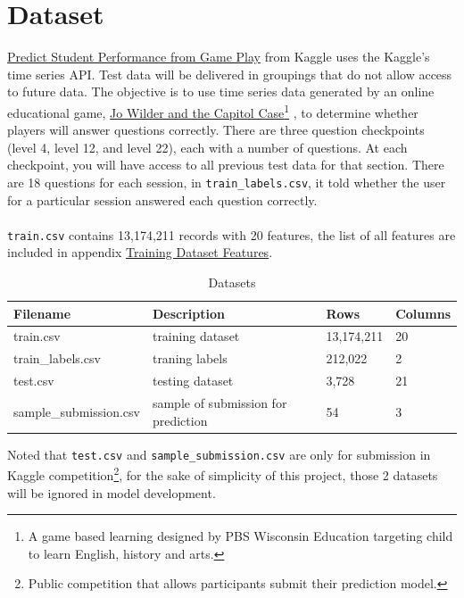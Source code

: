 \documentclass[11pt,a4paper]{article}
\begin{document}
    \section{Dataset}
    \href{https://www.kaggle.com/competitions/predict-student-performance-from-game-play/overview}{Predict Student Performance from Game Play} from Kaggle uses the Kaggle's time series API. Test data will be delivered in groupings that do not allow access to future data. The objective is to use time series data generated by an online educational game, \href{https://pbswisconsineducation.org/jowilder/about/}{Jo Wilder and the Capitol Case}\footnote{A game based learning designed by PBS Wisconsin Education targeting child to learn English, history and arts.} \cite{jo_wilder}, to determine whether players will answer questions correctly. There are three question checkpoints (level 4, level 12, and level 22), each with a number of questions. At each checkpoint, you will have access to all previous test data for that section. \cite{game_date} There are 18 questions for each session, in \texttt{train\_labels.csv}, it told whether the user for a particular session answered each question correctly. \\
    \\
    \texttt{train.csv} contains 13,174,211 records with 20 features, the list of all features are included in appendix \hyperref[appendix:training]{Training Dataset Features}. 
    \\
    \begin{table}[H]
        \centering
        \begin{tabular}{l | l | l l}
        Filename               & Description                                                       & Rows       & Columns \\ \hline
        train.csv              & training dataset                                                  & 13,174,211 & 20      \\
        train\_labels.csv      & traning labels                                                    & 212,022    & 2       \\
        test.csv               & testing dataset                                                   & 3,728      & 21      \\
        sample\_submission.csv & sample of submission for prediction & 54 & 3       
        \end{tabular}
        \caption{Datasets}
        \label{tab:dataset}
    \end{table}
    \noindent
    Noted that \texttt{test.csv} and \texttt{sample\_submission.csv} are only for submission in Kaggle competition\footnote{Public competition that allows participants submit their prediction model.}, for the sake of simplicity of this project, those 2 datasets will be ignored in model development.
\end{document}
